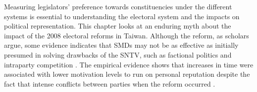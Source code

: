Measuring legislators' preference towards constituencies under the different systems is essential to understanding the electoral system and the impacts on political representation. This chapter looks at an enduring myth about the impact of the 2008 electoral reforms in Taiwan. Although the reform, as scholars argue, some evidence indicates that SMDs may not be as effective as initially presumed in solving drawbacks of the SNTV, such as factional politics and intraparty competition \citep[e.g.,][ ]{Wu2003, Batto2018}. The empirical evidence shows that increases in time were associated with lower motivation levels to run on personal reputation despite the fact that intense conflicts between parties when the reform occurred \citep{liao2020}. 